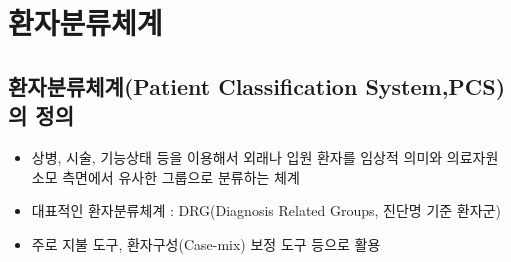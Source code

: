 \section{환자분류체계}
\subsection{환자분류체계(Patient Classification System,PCS)의 정의}
\begin{itemize}\tightlist
\item 상병, 시술, 기능상태 등을 이용해서 외래나 입원 환자를 임상적 의미와 의료자원 소모 측면에서 유사한 그룹으로 분류하는 체계
\item 대표적인 환자분류체계 : DRG(Diagnosis Related Groups, 진단명 기준 환자군)
\item 주로 지불 도구, 환자구성(Case-mix) 보정 도구 등으로 활용
\end{itemize}

